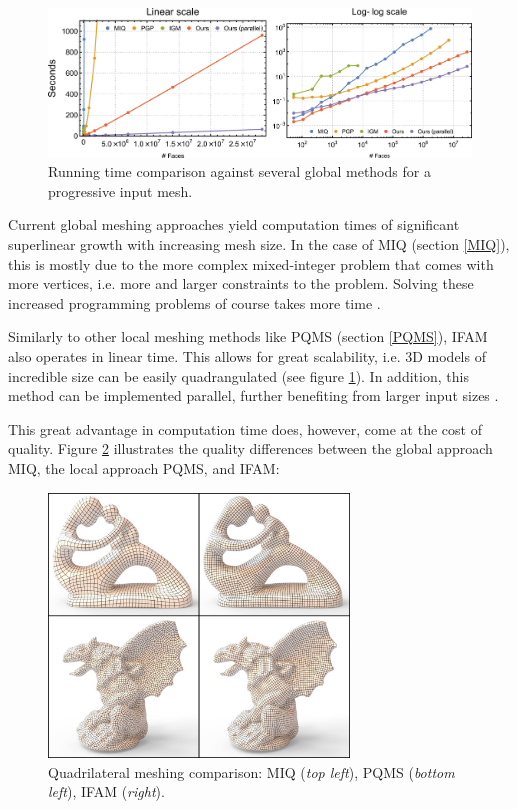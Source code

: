 \documentclass{ACGSeminar}
\begin{document}
\begin{figure}[htb!]
	\begin{centering}
		\includegraphics[width=12cm]{img/computation-time.png}\par
	\end{centering}
	\caption{Running time comparison against several global methods for a progressive input mesh. \cite{jakob2015instant}}
	\label{fig:computation-time}
\end{figure}

Current global meshing approaches yield computation times of significant superlinear growth with increasing mesh size. In the case of MIQ (section \ref{MIQ}), this is mostly due to the more complex mixed-integer problem that comes with more vertices, i.e. more and larger constraints to the problem. Solving these increased programming problems of course takes more time \cite{jakob2015instant,bommes2009mixed}.

Similarly to other local meshing methods like PQMS (section \ref{PQMS}), IFAM also operates in linear time. This allows for great scalability, i.e. 3D models of incredible size can be easily quadrangulated (see figure \ref{fig:computation-time}). In addition, this method can be implemented parallel, further benefiting from larger input sizes \cite{jakob2015instant}.\bigskip

This great advantage in computation time does, however, come at the cost of quality. Figure \ref{fig:quality} illustrates the quality differences between the global approach MIQ, the local approach PQMS, and IFAM:

\begin{figure}[htb!]
	\begin{centering}
		\includegraphics[width=8cm]{img/quality.png}\par
	\end{centering}
	\caption{Quadrilateral meshing comparison: MIQ \cite{bommes2009mixed} (\textit{top left}), PQMS \cite{tarini2010practical} (\textit{bottom left}), IFAM (\textit{right}). \cite{jakob2015instant}}
	\label{fig:quality}
\end{figure}
\end{document}
